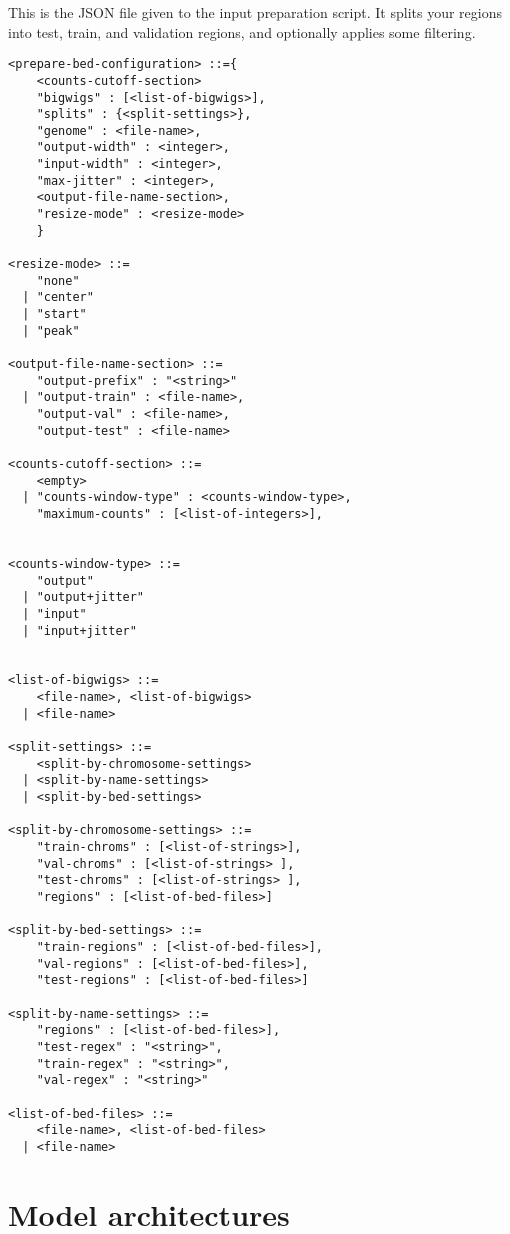 \documentclass{article}
\begin{document}
This is the JSON file given to the input preparation script. It splits your regions into 
test, train, and validation regions, and optionally applies some filtering. 

\begin{lstlisting}
<prepare-bed-configuration> ::={
    <counts-cutoff-section>
    "bigwigs" : [<list-of-bigwigs>],
    "splits" : {<split-settings>},
    "genome" : <file-name>,
    "output-width" : <integer>,
    "input-width" : <integer>,
    "max-jitter" : <integer>,
    <output-file-name-section>,
    "resize-mode" : <resize-mode>
    }

<resize-mode> ::= 
    "none"
  | "center"
  | "start"
  | "peak"

<output-file-name-section> ::=
    "output-prefix" : "<string>"
  | "output-train" : <file-name>,
    "output-val" : <file-name>,
    "output-test" : <file-name>

<counts-cutoff-section> ::=
    <empty>
  | "counts-window-type" : <counts-window-type>,
    "maximum-counts" : [<list-of-integers>],


<counts-window-type> ::=
    "output"
  | "output+jitter"
  | "input" 
  | "input+jitter"


<list-of-bigwigs> ::= 
    <file-name>, <list-of-bigwigs>
  | <file-name>

<split-settings> ::=
    <split-by-chromosome-settings>
  | <split-by-name-settings>
  | <split-by-bed-settings>

<split-by-chromosome-settings> ::=
    "train-chroms" : [<list-of-strings>],
    "val-chroms" : [<list-of-strings> ],
    "test-chroms" : [<list-of-strings> ],
    "regions" : [<list-of-bed-files>]

<split-by-bed-settings> ::=
    "train-regions" : [<list-of-bed-files>],
    "val-regions" : [<list-of-bed-files>],
    "test-regions" : [<list-of-bed-files>]

<split-by-name-settings> ::=
    "regions" : [<list-of-bed-files>],
    "test-regex" : "<string>",
    "train-regex" : "<string>",
    "val-regex" : "<string>"

<list-of-bed-files> ::=
    <file-name>, <list-of-bed-files>
  | <file-name>

\end{lstlisting}

\section{Model architectures}
\end{document}
